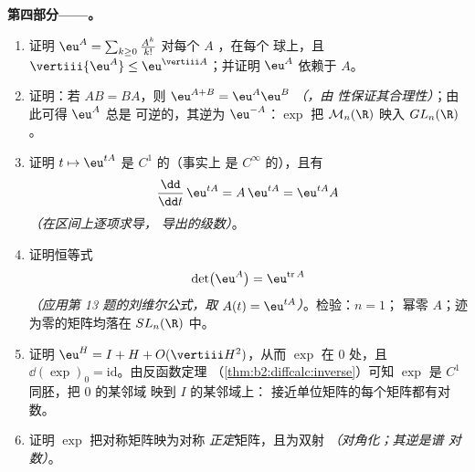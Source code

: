 \begin{problem}
\medskip
\noindent\textbf{第四部分——。}
\begin{enumerate}[resume]
  \item 证明 $\eu^A = \sum_{k\geq0}\frac{A^k}{k!}$
        对每个 $A$ ，在每个
        球上，且 $\vertiii{\eu^A} \leq
        \eu^{\vertiii A}$；并证明 $\eu^A$
        依赖于 $A$。
  \item 证明：若 $AB = BA$，则 $\eu^{A+B} =
        \eu^A\eu^B$ \emph{（，由
        性保证其合理性）}；由此可得 $\eu^A$ 总是
        可逆的，其逆为 $\eu^{-A}$：$\exp$ 把
        $\mathcal M_n(\R)$ 映入 $GL_n(\R)$。
  \item 证明 $t \mapsto \eu^{tA}$ 是 $C^1$ 的（事实上
        是 $C^\infty$ 的），且有
        \[
        \frac{\dd}{\dd t}\,\eu^{tA} = A\,\eu^{tA} =
        \eu^{tA}A
        \]
        \emph{（在区间上逐项求导，
        导出的级数）}。
  \item 证明恒等式
        \[
        \det\bigl(\eu^{A}\bigr) = \eu^{\operatorname{tr}A}
        \]
        \emph{（应用第 13 题的刘维尔公式，取
        $A(t) = \eu^{tA}$）}。检验：$n = 1$；
        幂零 $A$；迹为零的矩阵均落在
        $SL_n(\R)$ 中。
  \item 证明 $\eu^H = I + H + O(\vertiii H^2)$，从而 $\exp$ 在
        $0$ 处，且 $\dd(\exp)_0 =
        \mathrm{id}$。由反函数定理
        （\cref{thm:b2:diffcalc:inverse}）可知 $\exp$
        是 $C^1$ 同胚，把 $0$ 的某邻域
        映到 $I$ 的某邻域上：
        接近单位矩阵的每个矩阵都有对数。
  \item 证明 $\exp$ 把对称矩阵映为对称
        \emph{正定}矩阵，且为双射
        \emph{（对角化；其逆是谱
        对数）}。
\end{enumerate}


\end{problem}
